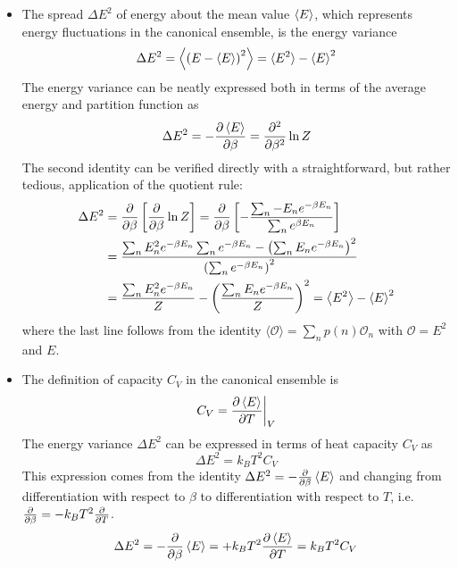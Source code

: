 \documentclass[11pt, a4paper]{article}
\begin{document}
\begin{itemize}
	
	\item The spread $ \Delta E^{2} $ of energy about the mean value $ \expval{E} $, which represents energy fluctuations in the canonical ensemble, is the energy variance
	\begin{equation*}
		\Delta E^{2} = \expval{\left(E - \expval{E}\right)^{2}} = \langle E^{2}\rangle - \expval{E}^{2}
	\end{equation*}
	The energy variance can be neatly expressed both in terms of the average energy and partition function as
	\begin{equation*}
		\Delta E^{2} = -\pdv{\expval{E}}{\beta} = \pdv[2]{}{\beta}\ln Z
	\end{equation*}
	The second identity can be verified directly with a straightforward, but rather tedious, application of the quotient rule:
	\begin{align*}
		\Delta E^{2} &= \pdv{}{\beta}\left[\pdv{}{\beta} \ln Z\right] = \pdv{}{\beta}\left[- \frac{\sum_{n}-E_{n}e^{-\beta E_{n}}}{\sum_{n}e^{\beta E_{n}}}\right]\\
		&= \frac{\sum_{n}E_{n}^{2}e^{-\beta E_{n}}\sum_{n}e^{-\beta E_{n}} - \left(\sum_{n}E_{n}e^{-\beta E_{n}}\right)^{2}}{\left(\sum_{n}e^{-\beta E_{n}}\right)^{2}}\\
		&=\frac{\sum_{n}E_{n}^{2}e^{-\beta E_{n}}}{Z} - \left(\frac{\sum_{n}E_{n}e^{-\beta E_{n}}}{Z}\right)^{2} =  \expval{E^{2}} - \expval{E}^{2}
	\end{align*}
	where the last line follows from the identity $  \langle \mathcal{O}\rangle = \sum_{n}p(n)\mathcal{O}_{n} $ with $ \mathcal{O} = E^{2} $ and $ E $.
	
	\item The definition of capacity $ C_{V} $ in the canonical ensemble is
	\begin{equation*}
		C_{V} = \pdv{\expval{E}}{T}\bigg |_{V}
	\end{equation*} 
	The energy variance $ \Delta E^{2} $ can be expressed in terms of heat capacity $ C_{V} $ as
	\begin{equation*}
		\Delta E^{2} = k_{B}T^{2} C_{V}
	\end{equation*}
	This expression comes from the identity $ \Delta E^{2} = -\pdv{}{\beta} \expval{E} $ and changing from differentiation with respect to $ \beta $ to differentiation with respect to $ T $, i.e. $ \pdv{}{\beta} = - k_{B}T^{2} \pdv{}{T} $.
	\begin{equation*}
		\Delta E^{2} = -\pdv{}{\beta} \expval{E} = + k_{B}T^{2} \pdv{\expval{E} }{T} = k_{B}T^{2}C_{V}
	\end{equation*}
	

\end{itemize}
\end{document}
